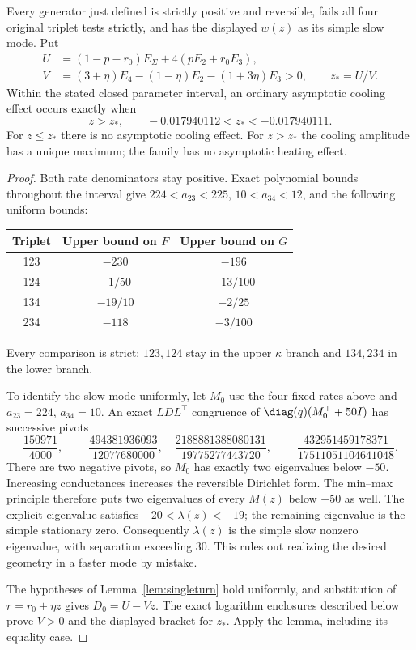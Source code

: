 \begin{theorem}\label{thm:family}
Every generator just defined is strictly positive and reversible, fails all four original triplet tests strictly, and has the displayed $w(z)$ as its simple slow mode. Put
\begin{align*}
U&=(1-p-r_0)E_\Sigma+4(pE_2+r_0E_3),\\
V&=(3+\eta)E_4-(1-\eta)E_2-(1+3\eta)E_3>0,\qquad z_*=U/V.
\end{align*}
Within the stated closed parameter interval, an ordinary asymptotic cooling effect occurs exactly when
\[
\boxed{z>z_*,\qquad -0.017940112<z_*<-0.017940111.}
\]
For $z\leq z_*$ there is no asymptotic cooling effect. For $z>z_*$ the cooling amplitude has a unique maximum; the family has no asymptotic heating effect.
\end{theorem}
\begin{proof}
Both rate denominators stay positive. Exact polynomial bounds throughout the interval give $224<a_{23}<225$, $10<a_{34}<12$, and the following uniform bounds:
\begin{center}
\begin{tabular}{ccc}
\toprule Triplet&Upper bound on $F$&Upper bound on $G$\\\midrule
123&$-230$&$-196$\\
124&$-1/50$&$-13/100$\\
134&$-19/10$&$-2/25$\\
234&$-118$&$-3/100$\\\bottomrule
\end{tabular}
\end{center}
Every comparison is strict; $123,124$ stay in the upper $\kappa$ branch and $134,234$ in the lower branch.

To identify the slow mode uniformly, let $M_0$ use the four fixed rates above and $a_{23}=224$, $a_{34}=10$. An exact $LDL^\top$ congruence of $\diag(q)(M_0^\top+50I)$ has successive pivots
\[
\frac{150971}{4000},\quad
-\frac{494381936093}{12077680000},\quad
\frac{2188881388080131}{19775277443720},\quad
-\frac{432951459178371}{17511051104641048}.
\]
There are two negative pivots, so $M_0$ has exactly two eigenvalues below $-50$. Increasing conductances increases the reversible Dirichlet form. The min--max principle therefore puts two eigenvalues of every $M(z)$ below $-50$ as well. The explicit eigenvalue satisfies $-20<\lambda(z)<-19$; the remaining eigenvalue is the simple stationary zero. Consequently $\lambda(z)$ is the simple slow nonzero eigenvalue, with separation exceeding 30. This rules out realizing the desired geometry in a faster mode by mistake.

The hypotheses of Lemma~\ref{lem:singleturn} hold uniformly, and substitution of $r=r_0+\eta z$ gives $D_0=U-Vz$. The exact logarithm enclosures described below prove $V>0$ and the displayed bracket for $z_*$. Apply the lemma, including its equality case.
\end{proof}


